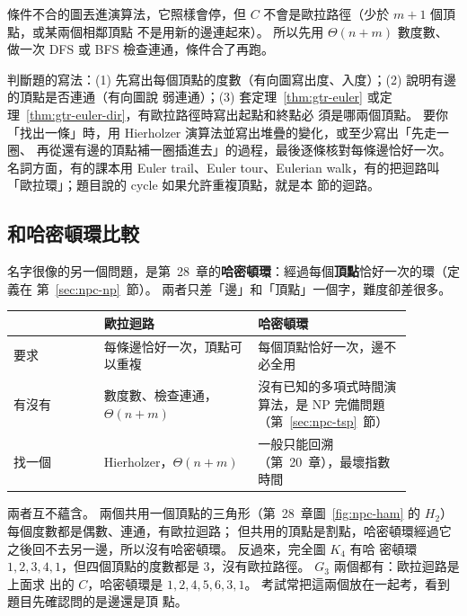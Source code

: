 條件不合的圖丟進演算法，它照樣會停，但 $C$ 不會是歐拉路徑（少於 $m + 1$ 個頂點，或某兩個相鄰頂點
不是用新的邊連起來）。 所以先用 $\Theta(n + m)$ 數度數、做一次 DFS 或 BFS 檢查連通，條件合了再跑。

\begin{examnote}
判斷題的寫法：(1) 先寫出每個頂點的度數（有向圖寫出度、入度）；(2) 說明有邊的頂點是否連通（有向圖說
弱連通）；(3) 套定理~\ref{thm:gtr-euler} 或定理~\ref{thm:gtr-euler-dir}，有歐拉路徑時寫出起點和終點必
須是哪兩個頂點。 要你「找出一條」時，用 Hierholzer 演算法並寫出堆疊的變化，或至少寫出「先走一圈、
再從還有邊的頂點補一圈插進去」的過程，最後逐條核對每條邊恰好一次。 名詞方面，有的課本用 Euler
trail、Euler tour、Eulerian walk，有的把迴路叫「歐拉環」；題目說的 cycle 如果允許重複頂點，就是本
節的迴路。
\end{examnote}

\subsection{和哈密頓環比較}

名字很像的另一個問題，是第~28~章的\textbf{哈密頓環}：經過每個\textbf{頂點}恰好一次的環（定義在
第~\ref{sec:npc-np}~節）。 兩者只差「邊」和「頂點」一個字，難度卻差很多。

\begin{center}
\small
\begin{tabular}{>{\raggedright\arraybackslash}p{0.2\linewidth}>{\raggedright\arraybackslash}p{0.34\linewidth}>{\raggedright\arraybackslash}p{0.34\linewidth}}
\toprule
 & 歐拉迴路 & 哈密頓環 \\
\midrule
要求 & 每條邊恰好一次，頂點可以重複 & 每個頂點恰好一次，邊不必全用 \\
有沒有 & 數度數、檢查連通，$\Theta(n + m)$ & 沒有已知的多項式時間演算法，是 NP 完備問題（第~\ref{sec:npc-tsp}~節） \\
找一個 & Hierholzer，$\Theta(n + m)$ & 一般只能回溯（第~20~章），最壞指數時間 \\
\bottomrule
\end{tabular}
\end{center}

兩者互不蘊含。 兩個共用一個頂點的三角形（第~28~章圖~\ref{fig:npc-ham} 的 $H_2$）每個度數都是偶數、連通，有歐拉迴路；
但共用的頂點是割點，哈密頓環經過它之後回不去另一邊，所以沒有哈密頓環。 反過來，完全圖 $K_4$ 有哈
密頓環 $1, 2, 3, 4, 1$，但四個頂點的度數都是 $3$，沒有歐拉路徑。 $G_3$ 兩個都有：歐拉迴路是上面求
出的 $C$，哈密頓環是 $1, 2, 4, 5, 6, 3, 1$。 考試常把這兩個放在一起考，看到題目先確認問的是邊還是頂
點。

